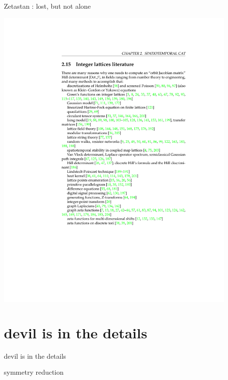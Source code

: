 \begin{frame}{Zetastan : lost, but not alone}
\begin{center}
\hfill\includegraphics[width=0.90\textwidth]{../kittens/lattLitClip2}
\end{center}
\end{frame} %

\section[devil is in the details]
 {devil is in the details}
\label{s:byeDynamics}

\begin{frame}{devil is in the details}
\vfill
\begin{center}
{\huge symmetry reduction}
\end{center}
\vfill
\end{frame} %

